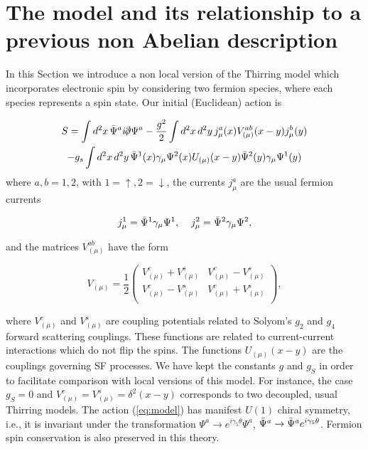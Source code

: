 \documentclass[a4paper,a4paper]{article}
\begin{document}
\section{The model and its relationship to a previous non Abelian description}

 In this Section we introduce a non local version of the Thirring model which incorporates
electronic spin by considering two fermion species, where each species represents a
spin state. Our initial (Euclidean) action is

\begin{multline}\label{eq:model}
S = \int d^2x\,\PsiB^a i \slp \Psi^a - \frac{g^2}{2}\int d^2x\,d^2y\, j_\mu^a(x)
V^{ab}_{(\mu)}(x-y)j_\mu^b(y)\\ - g_s\int d^2x\,d^2y\,\PsiB^1 (x)\gamma_\mu\Psi^2
(x)U_{(\mu)}(x-y)\PsiB^2(y)\gamma_\mu\Psi^1(y)
\end{multline}
where $a,b=1,2$, with $1=\uparrow ,2=\downarrow$, the currents $j^a_\mu$ are the usual
fermion currents

\begin{equation}
j_\mu^1=\bar{\Psi}^1\gamma_\mu\Psi^1,\;\;\;\;
j_\mu^2=\bar{\Psi}^2\gamma_\mu\Psi^2,
\end{equation}

\noindent and the matrices $V_{(\mu)}^{ab}$ have the form

\begin{equation}
V_{(\mu)} = \frac{1}{2}
\begin{pmatrix}
      V^c_{(\mu)}+V^s_{(\mu)} & V^c_{(\mu)}-V^s_{(\mu)} \\
      V^c_{(\mu)}-V^s_{(\mu)} & V^c_{(\mu)}+V^s_{(\mu)} \\
\end{pmatrix},
\end{equation}

\noindent where $V^c_{(\mu)}$ and $V^s_{(\mu)}$ are coupling potentials related to
Solyom's \cite{Solyom} $g_2$ and $g_4$ forward scattering couplings. These functions
are related to current-current interactions which do not flip the spins. The functions
$U_{(\mu)}(x-y)$ are the couplings governing SF processes. We have kept the constants
$g$ and $g_S$ in order to facilitate comparison with local versions of this model. For
instance, the case $g_S=0$ and $V^c_({\mu})=V^s_({\mu})=\delta^2(x-y)$ corresponds to
two decoupled, usual Thirring models.  The action (\ref{eq:model}) has manifest $U(1)$
chiral symmetry, i.e., it is invariant under the transformation $\Psi^a\rightarrow
e^{i\gamma_5 \theta}\Psi^a$, $\bar{\Psi}^a\rightarrow \bar{\Psi}^a e^{i\gamma_5 \theta}$.
Fermion spin conservation is also preserved in this theory.
\end{document}

